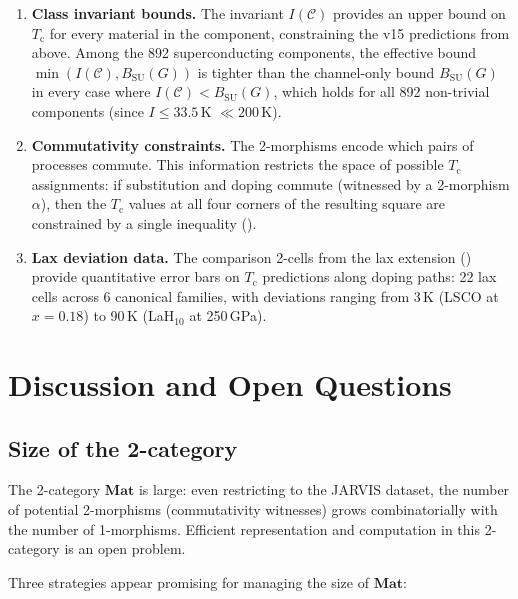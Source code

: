 \documentclass[12pt,a4paper]{article}
\theoremstyle{plain}
\theoremstyle{definition}
\theoremstyle{remark}
\newcommand{\Tc}{T_{\mathrm{c}}}
\newcommand{\Matl}{\mathbf{Mat}}
\begin{document}
\begin{enumerate}
  \item \textbf{Class invariant bounds.}  The invariant $I(\mathcal{C})$
    provides an upper bound on $\Tc$ for every material in the component,
    constraining the v15 predictions from above.  Among the 892
    superconducting components, the effective bound
    $\min(I(\mathcal{C}), B_{\mathrm{SU}}(G))$ is tighter than the
    channel-only bound $B_{\mathrm{SU}}(G)$ in every case where
    $I(\mathcal{C}) < B_{\mathrm{SU}}(G)$, which holds for all 892
    non-trivial components (since $I \leq 33.5$\,K $\ll 200$\,K).

  \item \textbf{Commutativity constraints.}  The 2-morphisms encode
    which pairs of processes commute.  This information restricts the
    space of possible $\Tc$ assignments: if substitution and doping commute
    (witnessed by a 2-morphism $\alpha$), then the $\Tc$ values at all
    four corners of the resulting square are constrained by a single
    inequality ().

  \item \textbf{Lax deviation data.}  The comparison 2-cells from the lax
    extension () provide quantitative error bars
    on $\Tc$ predictions along doping paths: 22 lax cells across 6
    canonical families, with deviations ranging from 3\,K (LSCO at
    $x = 0.18$) to 90\,K (LaH$_{10}$ at 250\,GPa).
\end{enumerate}


\section{Discussion and Open Questions}\label{sec:discussion}

\subsection{Size of the 2-category}

The 2-category $\Matl$ is large: even restricting to the JARVIS dataset,
the number of potential 2-morphisms (commutativity witnesses) grows
combinatorially with the number of 1-morphisms.  Efficient representation
and computation in this 2-category is an open problem.

Three strategies appear promising for managing the size of $\Matl$:
\end{document}

